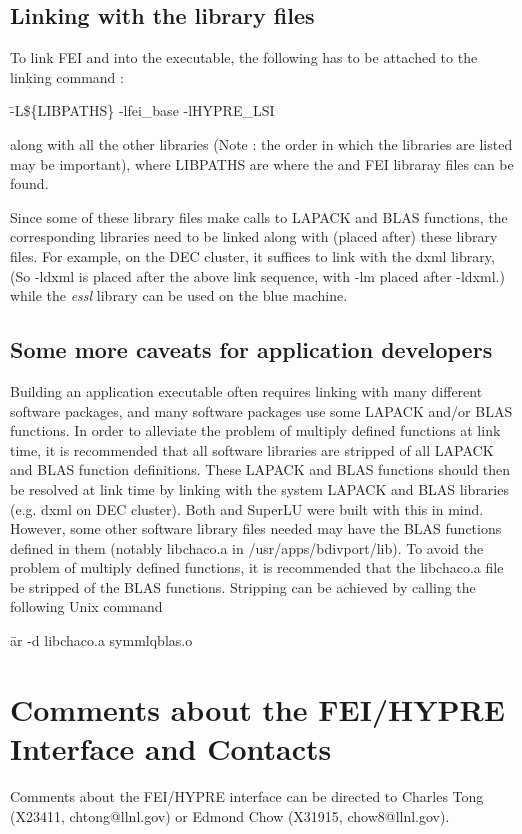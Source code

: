 \subsection{Linking with the library files}

To link FEI and \hypre{} into the executable, the following has to be
attached to the linking command :

\begin{tabbing}
\hspace{0.5in} \= {\sf -L\$\{LIBPATHS\} -lfei\_base -lHYPRE\_LSI} 
\end{tabbing}
along with all the other libraries (Note : the order in which the libraries are
listed may be important), where {\sf LIBPATHS} are where 
the \hypre{} and FEI libraray files can be found.  

Since some of these library files make calls to LAPACK and BLAS functions, 
the corresponding libraries need to be linked along with (placed after) these 
library files.  For example, on the DEC cluster, it suffices to link
with the {\sf dxml} library, (So {\sf -ldxml} is placed after the above link
sequence, with {\sf -lm} placed after {\sf -ldxml}.) while the {\it essl}
library can be used on the blue machine.

\subsection{Some more caveats for application developers}

Building an application executable often requires linking with many different
software packages, and many software packages use some LAPACK and/or BLAS
functions.  In order to alleviate the problem of multiply defined functions
at link time, it is recommended that all software libraries are stripped of
all LAPACK and BLAS function definitions.  These LAPACK and BLAS functions 
should then be resolved at link time by linking with the system LAPACK and
BLAS libraries (e.g. dxml on DEC cluster).  Both \hypre{} and SuperLU were
built with this in mind.  However, some other software library files needed
may have the BLAS functions defined in them (notably libchaco.a
in /usr/apps/bdivport/lib).  To avoid the problem of multiply defined 
functions, it is recommended that the libchaco.a file be stripped of the 
BLAS functions.
Stripping can be achieved by calling the following Unix command

\begin{tabbing}
\hspace{0.5in} \= {\sf ar -d libchaco.a symmlqblas.o}
\end{tabbing}

\section{Comments about the FEI/HYPRE Interface and Contacts}

Comments about the FEI/HYPRE interface can be directed to Charles Tong
(X23411, chtong@llnl.gov) or Edmond Chow (X31915, chow8@llnl.gov).

